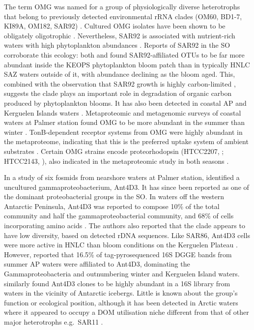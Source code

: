 
The term \ac{OMG} was named for a group of physiologically diverse heterotrophs that belong to previously detected environmental rRNA clades (OM60, BD1-7, KI89A, OM182, SAR92) \cite{Cho:2004gm}.
Cultured \ac{OMG} isolates have been shown to be obligately oligotrophic \cite{Cho:2004gm}.
Nevertheless, SAR92 is associated with nutrient-rich waters with high phytoplankton abundances \cite{Stingl:2007ja,Pinhassi:2004is}.
Reports of SAR92 in the \ac{SO} corroborate this ecology: both \citet{West:2008kc} and \citet{Obernosterer:2011df} found SAR92-affiliated \acp{OTU} to be far more abundant inside the \ac{KEOPS} phytoplankton bloom patch than in typically \ac{HNLC} \ac{SAZ} waters outside of it, with abundance declining as the bloom aged.
This, combined with the observation that SAR92 growth is highly carbon-limited \cite{Stingl:2007ja}, suggests the clade plays an important role in degradation of organic carbon produced by phytoplankton blooms.
It has also been detected in coastal \ac{AP} and Kerguelen Islands waters \cite{Ghiglione:2011ee}.
Metaproteomic and metagenomic surveys of coastal waters at Palmer station found \ac{OMG} to be more abundant in the summer than winter \cite{Williams:2012bs}.
TonB-dependent receptor systems from \ac{OMG} were highly abundant in the metaproteome, indicating that this is the preferred uptake system of ambient substrates \cite{Williams:2012bs}.
Certain \ac{OMG} strains encode proteorhodopsin (HTCC2207, \citet{Stingl:2007ja}; HTCC2143, \citet{Oh:2010di}), also indicated in the metaproteomic study in both seasons \cite{Williams:2012bs}.


In a study of six fosmids from nearshore waters at Palmer station, \citet{Grzymski:2006ds} identified a uncultured gammaproteobacterium, Ant4D3.
It has since been reported as one of the dominant proteobacterial groups in the \ac{SO}.
In waters off the western Antarctic Peninsula, Ant4D3 was reported to compose 10\% of the total community and half the gammaproteobacterial community, and 68\% of cells incorporating amino acids \cite{Straza:2010io}.
The authors also reported that the clade appears to have low diversity, based on detected rDNA sequences.
Like SAR86, Ant4D3 cells were more active in \ac{HNLC} than bloom conditions on the Kerguelen Plateau \cite{West:2008kc}.
However, \citet{Ghiglione:2011ee} reported that 16.5\% of tag-pyrosequenced 16S \ac{DGGE} bands from summer \ac{AP} waters were affiliated to Ant4D3, dominating the Gammaproteobacteria and outnumbering winter and Kerguelen Island waters.
\citet{Murray:2011ib} similarly found Ant4D3 clones to be highly abundant in a 16S library from waters in the vicinity of Antarctic icebergs.
Little is known about the group's function or ecological position, although it has been detected in Arctic waters where it appeared to occupy a \ac{DOM} utilisation niche different from that of other major heterotrophs e.g.\ SAR11 \cite{Nikrad:2012fa}.

